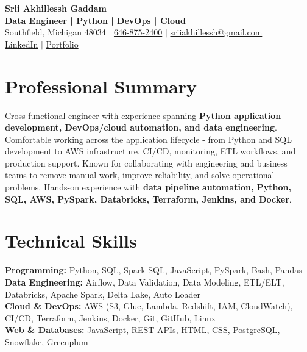 \documentclass[letterpaper,10pt]{article}
\begin{document}
\fontsize{9.35pt}{10.45pt}\selectfont

\begin{center}
    {\LARGE \textbf{Srii Akhillessh Gaddam}} \\[-1pt]
    \textbf{Data Engineer | Python | DevOps | Cloud} \\[2pt]
    Southfield, Michigan 48034 $|$
    \href{tel:6468752400}{646-875-2400} $|$
    \href{mailto:sriiakhillessh@gmail.com}{sriiakhillessh@gmail.com} \\[1pt]
    \href{https://www.linkedin.com/in/srii-akhiilessh-gaddam-b48668191/}{LinkedIn} $|$
    \href{https://sriiakhillesshg.github.io/portfolio/}{Portfolio}
\end{center}
\vspace{-8pt}

\section{Professional Summary}
\small{Cross-functional engineer with experience spanning \textbf{Python application development, DevOps/cloud automation, and data engineering}. Comfortable working across the application lifecycle - from Python and SQL development to AWS infrastructure, CI/CD, monitoring, ETL workflows, and production support. Known for collaborating with engineering and business teams to remove manual work, improve reliability, and solve operational problems. Hands-on experience with \textbf{data pipeline automation, Python, SQL, AWS, PySpark, Databricks, Terraform, Jenkins, and Docker}.}

\section{Technical Skills}
\small{
\textbf{Programming:} Python, SQL, Spark SQL, JavaScript, PySpark, Bash, Pandas \\
\textbf{Data Engineering:} Airflow, Data Validation, Data Modeling, ETL/ELT, Databricks, Apache Spark, Delta Lake, Auto Loader \\
\textbf{Cloud \& DevOps:} AWS (S3, Glue, Lambda, Redshift, IAM, CloudWatch), CI/CD, Terraform, Jenkins, Docker, Git, GitHub, Linux \\
\textbf{Web \& Databases:} JavaScript, REST APIs, HTML, CSS, PostgreSQL, Snowflake, Greenplum
}

\end{document}
